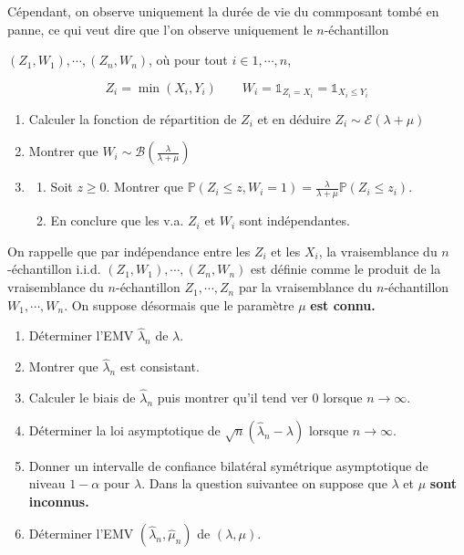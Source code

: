 \begin{mdframed}
\begin{exercice}
Cépendant, on observe uniquement la durée de vie du commposant tombé en panne, ce qui veut dire que l'on observe uniquement le $n$-échantillon 

$(Z_1,W_1) , \cdots , (Z_n,W_n)$, où pour tout $i \in 1 , \cdots , n$,

$$
Z_i = \min (X_i,Y_i) \qquad W_i = \mathbb{1}_{Z_i = X_i} = \mathbb{1}_{X_i \leq Y_i}   
$$

\smallskip

\begin{enumerate}
\item Calculer la fonction de répartition de $Z_i$ et en déduire $Z_i \sim \mathcal{E} (\lambda + \mu )$
\item Montrer que $W_i \sim \mathcal{B}( \frac{\lambda}{\lambda + \mu} )$
\item
\begin{enumerate}
\item Soit $z \geq 0$. Montrer que $\mathbb{P}(Z_i \leq z , W_i = 1) = \frac{\lambda}{\lambda + \mu} \mathbb{P}(Z_i \leq z_i)$.
\item En conclure que les v.a. $Z_i$ et $W_i$ sont indépendantes.
\end{enumerate}
\end{enumerate}

On rappelle que par indépendance entre les $Z_i$ et les $X_i$, la vraisemblance du $n$-échantillon i.i.d. $(Z_1,W_1) , \cdots , (Z_n,W_n)$ est définie comme le produit de la vraisemblance du $n$-échantillon $Z_1 , \cdots , Z_n$ par la vraisemblance du $n$-échantillon $W_1 , \cdots , W_n$. On suppose désormais que le paramètre $\mu$ \textbf{est connu.}

\begin{enumerate}
\item Déterminer l'EMV $\hat{\lambda}_n$ de $\lambda$.
\item Montrer que $\hat{\lambda}_n$ est consistant.
\item Calculer le biais de $\hat{\lambda}_n$ puis montrer qu'il tend ver 0 lorsque $n \to \infty$.
\item Déterminer la loi asymptotique de $\sqrt{n} ( \hat{\lambda}_n - \lambda)$ lorsque $n \to \infty$.
\item Donner un intervalle de confiance bilatéral symétrique asymptotique de niveau $1 - \alpha$ pour $\lambda$. Dans la question suivantee on suppose que $\lambda$ et $\mu$ \textbf{sont inconnus.}
\item Déterminer l'EMV $(\hat{\lambda}_n,\hat{\mu}_n)$ de $( \lambda , \mu)$.
\end{enumerate}
\end{exercice}
\end{mdframed}

